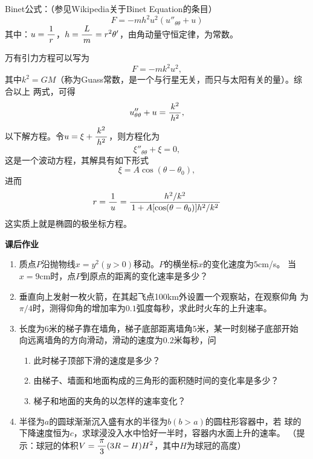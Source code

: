 \begin{shaded}
	Binet公式：（参见Wikipedia关于Binet Equation的条目）
	$$F=-mh^2u^2\left(u''_{\theta\theta}+u\right)$$
	其中：$u=\displaystyle\frac{\,{1}\,}{\,{r}\,}$，$h=\displaystyle\frac{\,{L}\,}{\,{m}\,}=r^2\theta'$，由角动量守恒定律，为常数。
	
	万有引力方程可以写为
	$$F=-mk^2u^2,$$
	其中$k^2=GM$（称为{\kaishu Guass常数}，是一个与行星无关，而只与太阳有关的量）。综合以上
	两式，可得
	$$u''_{\theta\theta}+u=\displaystyle\frac{\,{k^2}\,}{\,{h^2}\,},$$
	以下解方程。令$u=\xi+\displaystyle\frac{\,{k^2}\,}{\,{h^2}\,}$，则方程化为
	$$\xi''_{\theta\theta}+\xi=0,$$
	这是一个波动方程，其解具有如下形式
	$$\xi=A\cos(\theta-\theta_0),$$
	进而
	$$r=\displaystyle\frac{\,{1}\,}{\,{u}\,}=\displaystyle\frac{\,{h^2/k^2}\,}{\,{1+A[\cos(\theta-\theta_0)]h^2/k^2}\,}$$
	这实质上就是椭圆的极坐标方程。
\end{shaded}

\begin{ext}
	{\centering\bf 课后作业}
	
	\begin{enumerate}  
	  \item 质点$P$沿抛物线$x=y^2(y>0)$移动。$P$的横坐标$x$的变化速度为$5$cm/s。
		当$x=9$cm时，点$P$到原点的距离的变化速率是多少？
	  \item 垂直向上发射一枚火箭，在其起飞点100km外设置一个观察站，在观察仰角
	  为$\pi/4$时，测得仰角的增加率为$0.1$弧度每秒，求此时火车的上升速率。
	  \item 长度为$6$米的梯子靠在墙角，梯子底部距离墙角$5$米，某一时刻梯子底部开始
	  向远离墙角的方向滑动，滑动的速度为$0.2$米每秒，问
	  \begin{enumerate}[(1)]
	    \item 此时梯子顶部下滑的速度是多少？
	    \item 由梯子、墙面和地面构成的三角形的面积随时间的变化率是多少？
	    \item 梯子和地面的夹角的以怎样的速率变化？
	  \end{enumerate}
	  \item 半径为$a$的圆球渐渐沉入盛有水的半径为$b(b>a)$的圆柱形容器中，若
	  球的下降速度恒为$c$，求球浸没入水中恰好一半时，容器内水面上升的速率。
	  （提示：球冠的体积$V=\displaystyle\frac{\,{\pi}\,}{\,{3}\,}(3R-H)H^2$，其中$H$为球冠的高度）
	\end{enumerate}
\end{ext}


